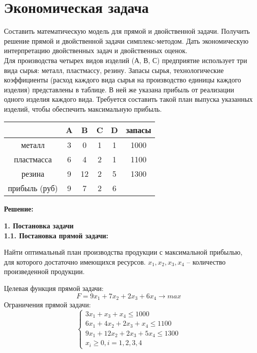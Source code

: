 \chapter{Экономическая задача}
{}
\begin{flushleft}
    Составить математическую модель для прямой и двойственной задачи. Получить решение прямой и двойственной задачи симплекс-методом. Дать экономическую интерпретацию двойственных задач и двойственных оценок.\\
    Для производства четырех видов изделий (А, В, С) предприятие использует три вида сырья: металл, пластмассу, резину. Запасы сырья, технологические коэффициенты (расход каждого вида сырья на производство единицы каждого изделия) представлены в таблице. В ней же указана прибыль от реализации одного изделия каждого вида. Требуется составить такой план выпуска указанных изделий, чтобы обеспечить максимальную прибыль.
\end{flushleft}

\begin{center}
    \begin{tabular}{|c | c | c | c | c | c|} 
         \hline
            & A & B & C & D & запасы\\
         \hline
            металл & 3 & 0 & 1 & 1 & 1000\\
         \hline
            пластмасса & 6 & 4 & 2 & 1 & 1100\\
         \hline
            резина & 9 & 12 & 2 & 5 & 1300\\
         \hline
            прибыль (руб) & 9 & 7 & 2 & 6 & \\
        \hline
    \end{tabular}
\end{center}

\begin{center}
    {\bf
    Решение:}
\end{center}

{\bf1. Постановка задачи}\\
{\bf1.1. Постановка прямой задачи:}
\begin{flushleft}
    Найти оптимальный план производства продукции с максимальной прибылью, для которого достаточно имеющихся ресурсов. $x_1, x_2, x_3, x_4$ – количество произведенной продукции.\\
\end{flushleft}
Целевая функция прямой задачи:
\begin{equation*}
    F = 9x_1 + 7x_2 + 2x_3 + 6x_4 \rightarrow max
\end{equation*}
Ограничения прямой задачи:
\begin{equation*}
    \begin{cases}
        3x_1 + x_3 + x_4 \le 1000 \\
        6x_1 + 4x_2 + 2x_3 + x_4 \le 1100 \\
        9x_1 + 12x_2 + 2x_3 + 5x_4 \le 1300 \\
        x_i \ge 0, i = 1, 2, 3, 4
    \end{cases}
\end{equation*}

